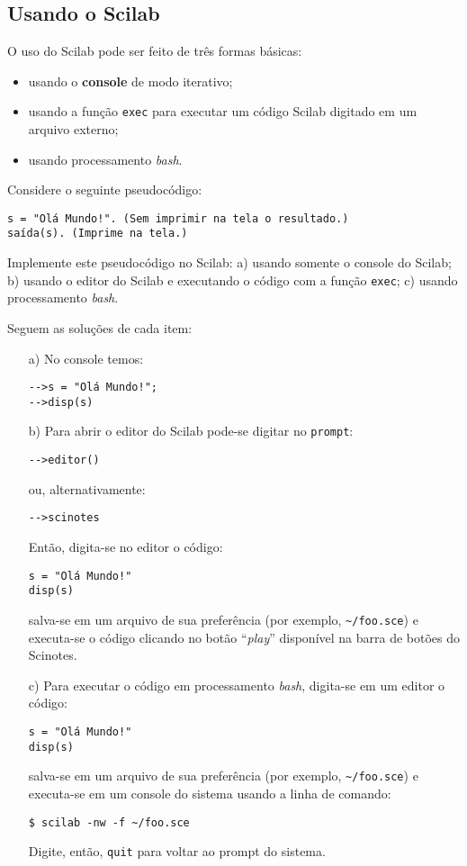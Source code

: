 \documentclass[main.tex]{subfiles}
\begin{document}
\subsection{Usando o Scilab}

O uso do Scilab pode ser feito de três formas básicas:
\begin{itemize}
\item usando o {\bf console} de modo iterativo;
\item usando a função \verb+exec+ para executar um código Scilab digitado em um arquivo externo;
\item usando processamento {\it bash}.
\end{itemize}

\begin{ex}
  Considere o seguinte pseudocódigo:
\begin{verbatim}
s = "Olá Mundo!". (Sem imprimir na tela o resultado.)
saída(s). (Imprime na tela.)
\end{verbatim}
Implemente este pseudocódigo no Scilab: a) usando somente o console do Scilab; b) usando o editor do Scilab e executando o código com a função \verb+exec+; c) usando processamento {\it bash}.
\end{ex}
\begin{sol} Seguem as soluções de cada item:
  \begin{itemize}
  \item[a)]  No console temos:
\begin{verbatim}
-->s = "Olá Mundo!";
-->disp(s)
\end{verbatim}
  \item[b)] Para abrir o editor do Scilab pode-se digitar no \verb+prompt+:
\begin{verbatim}
-->editor()
\end{verbatim}
ou, alternativamente:
\begin{verbatim}
-->scinotes
\end{verbatim}
Então, digita-se no editor o código:
\begin{verbatim}
s = "Olá Mundo!"
disp(s)
\end{verbatim}
salva-se em um arquivo de sua preferência (por exemplo, \verb+~/foo.sce+) e executa-se o código clicando no botão ``{\it play}'' disponível na barra de botões do Scinotes.
\item[c)] Para executar o código em processamento {\it bash}, digita-se em um editor o código:
\begin{verbatim}
s = "Olá Mundo!"
disp(s)
\end{verbatim}
salva-se em um arquivo de sua preferência (por exemplo, \verb+~/foo.sce+) e executa-se em um console do sistema usando a linha de comando:
\begin{verbatim}
$ scilab -nw -f ~/foo.sce
\end{verbatim}
Digite, então, \verb+quit+ para voltar ao prompt do sistema.
\end{itemize}
\end{sol}
\end{document}
